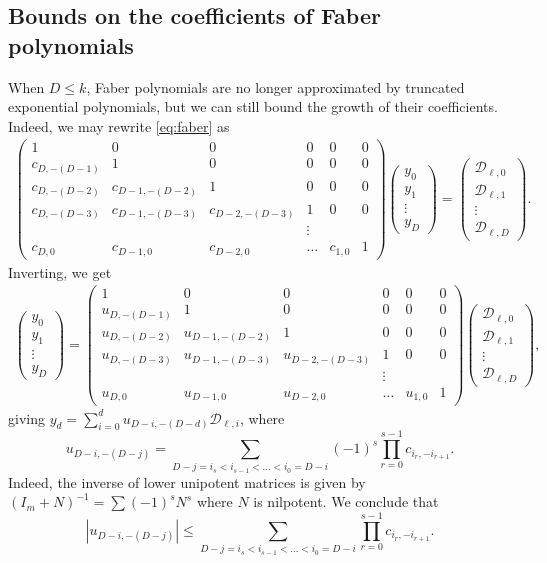 \documentclass[12pt]{amsart}
\theoremstyle{plain} %
\theoremstyle{definition}
\theoremstyle{remark}
\numberwithin{equation}{section}
\begin{document}
\subsection{Bounds on the coefficients of Faber polynomials}
When $D\leq k$, Faber polynomials are no longer approximated by truncated exponential polynomials, but we can still bound the growth of their coefficients. Indeed, we may rewrite \eqref{eq:faber} as 
\begin{align*}
  \begin{pmatrix} 1&0&0&0&0&0\\
  c_{D,-(D-1)}&1&0&0&0&0\\
  c_{D,-(D-2)}&c_{D-1,-(D-2)}&1&0&0&0\\
  c_{D,-(D-3)}&c_{D-1,-(D-3)}&c_{D-2,-(D-3)}&1&0&0\\
  &&&\vdots&&\\
  c_{D,0}&c_{D-1,0}&c_{D-2,0}&\ldots&c_{1,0}&1
  \end{pmatrix}\begin{pmatrix} y_0\\y_1\\\vdots\\y_D\end{pmatrix}=\begin{pmatrix} \mathcal{D}_{\ell,0}\\\mathcal{D}_{\ell,1}\\\vdots\\\mathcal{D}_{\ell,D}\end{pmatrix}.
\end{align*}
Inverting, we get
\begin{align*}
\begin{pmatrix} y_0\\y_1\\\vdots\\y_D\end{pmatrix}=  \begin{pmatrix} 1&0&0&0&0&0\\
  u_{D,-(D-1)}&1&0&0&0&0\\
  u_{D,-(D-2)}&u_{D-1,-(D-2)}&1&0&0&0\\
  u_{D,-(D-3)}&u_{D-1,-(D-3)}&u_{D-2,-(D-3)}&1&0&0\\
  &&&\vdots&&\\
  u_{D,0}&u_{D-1,0}&u_{D-2,0}&\ldots&u_{1,0}&1
  \end{pmatrix}\begin{pmatrix} \mathcal{D}_{\ell,0}\\\mathcal{D}_{\ell,1}\\\vdots\\\mathcal{D}_{\ell,D}\end{pmatrix},
\end{align*}
giving $\displaystyle y_d=\sum_{i=0}^d u_{D-i,-(D-d)}\mathcal{D}_{\ell,i}$,
where
\[u_{D-i,-(D-j)}=\sum_{D-j= i_s<i_{s-1}<\ldots <i_0=D-i}(-1)^s\prod_{r=0}^{s-1}c_{i_r,-i_{r+1}}.\]
Indeed, the inverse of lower unipotent matrices is given by $(I_m+N)^{-1}=\sum (-1)^s N^s$ where $N$ is nilpotent. We conclude that
\[|u_{D-i,-(D-j)}|\leq \sum_{D-j= i_s<i_{s-1}<\ldots
  <i_0=D-i}\prod_{r=0}^{s-1}c_{i_r,-i_{r+1}}.\]
\end{document}
